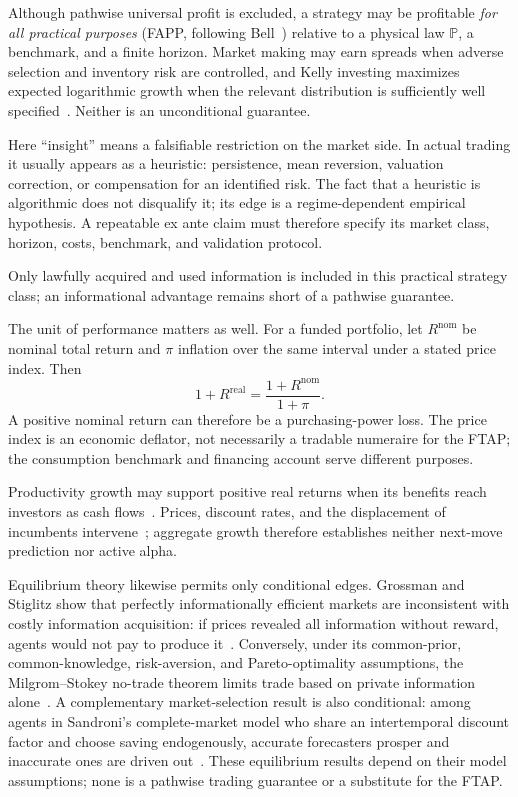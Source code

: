 \documentclass[aps,pra,reprint,superscriptaddress,amsmath,amssymb,floatfix]{revtex4-2}
\theoremstyle{plain}
\theoremstyle{definition}
\theoremstyle{remark}
\begin{document}
Although pathwise universal profit is excluded, a strategy may be profitable
\emph{for all practical purposes} (FAPP, following Bell~\cite{bell-a}) relative
to a physical law \(\mathbb P\), a benchmark, and a finite horizon. Market
making may earn spreads when adverse selection and inventory risk are
controlled, and Kelly investing maximizes expected logarithmic growth when the
relevant distribution is sufficiently well specified~\cite{Kelly1956}. Neither
is an unconditional guarantee.

Here ``insight'' means a falsifiable restriction on the market side. In actual
trading it usually appears as a heuristic: persistence, mean reversion,
valuation correction, or compensation for an identified risk. The fact that a
heuristic is algorithmic does not disqualify it; its edge is a regime-dependent
empirical hypothesis. A repeatable ex ante claim must therefore specify its
market class, horizon, costs, benchmark, and validation protocol.

Only lawfully acquired and used information is included in this practical
strategy class; an informational advantage remains short of a pathwise
guarantee.

The unit of performance matters as well. For a funded portfolio, let
\(R^{\mathrm{nom}}\) be nominal total return and \(\pi\) inflation over the same
interval under a stated price index. Then
\begin{equation}
  1+R^{\mathrm{real}}
  =\frac{1+R^{\mathrm{nom}}}{1+\pi}.
  \label{eq:real-return}
\end{equation}
A positive nominal return can therefore be a purchasing-power loss. The price
index is an economic deflator, not necessarily a tradable numeraire for the
FTAP; the consumption benchmark and financing account serve different
purposes.

Productivity growth may support positive real returns when its benefits reach
investors as cash flows~\cite{Solow1957}. Prices, discount rates, and the
displacement of incumbents intervene~\cite{Schumpeter1942}; aggregate growth
therefore establishes neither next-move prediction nor active alpha.

Equilibrium theory likewise permits only conditional edges. Grossman and
Stiglitz show that perfectly informationally efficient markets are inconsistent
with costly information acquisition: if prices revealed all information
without reward, agents would not pay to produce it~\cite{GrossmanStiglitz1980}.
Conversely, under its common-prior, common-knowledge, risk-aversion, and
Pareto-optimality assumptions, the Milgrom--Stokey no-trade theorem limits trade
based on private information alone~\cite{MilgromStokey1982}. A complementary
market-selection result is also conditional: among agents in Sandroni's
complete-market model who share an intertemporal discount factor and choose
saving endogenously, accurate forecasters prosper and inaccurate ones are driven
out~\cite{Sandroni2000}. These equilibrium results depend on their model
assumptions; none is a pathwise trading guarantee or a substitute for the FTAP.
\end{document}

